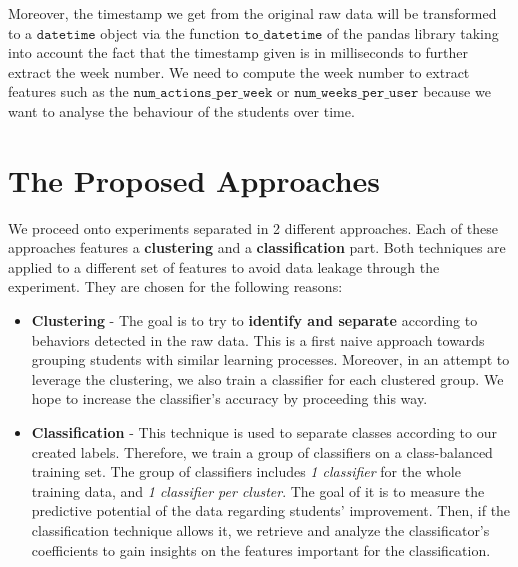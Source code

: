 \documentclass[sigplan,screen]{acmart}
\begin{document}
Moreover, the timestamp we get from the original raw data will be transformed to a $\texttt{datetime}$ object via the function $\texttt{to\_datetime}$ of the pandas library taking into account the fact that the timestamp given is in milliseconds to further extract the week number. We need to compute the week number to extract features such as the $\texttt{num\_actions\_per\_week}$ or $\texttt{num\_weeks\_per\_user}$ because we want to analyse the behaviour of the students over time.


\section{The Proposed Approaches}\label{sec:propapp}

We proceed onto experiments separated in 2 different approaches. Each of these approaches features a \textbf{clustering} and a \textbf{classification} part. Both techniques are applied to a different set of features to avoid data leakage through the experiment. They are chosen for the following reasons:

\begin{itemize}
    \item \textbf{Clustering} - The goal is to try to \textbf{identify and separate} according to behaviors detected in the raw data. This is a first naive approach towards grouping students with similar learning processes. Moreover, in an attempt to leverage the clustering, we also train a classifier for each clustered group. We hope to increase the classifier's accuracy by proceeding this way.
    \item \textbf{Classification} - This technique is used to separate classes according to our created labels. Therefore, we train a group of classifiers on a class-balanced training set. The group of classifiers includes \textit{1 classifier} for the whole training data, and \textit{1 classifier per cluster}. The goal of it is to measure the predictive potential of the data regarding students' improvement. Then, if the classification technique allows it, we retrieve and analyze the classificator's coefficients to gain insights on the features important for the classification.
\end{itemize}
\end{document}
